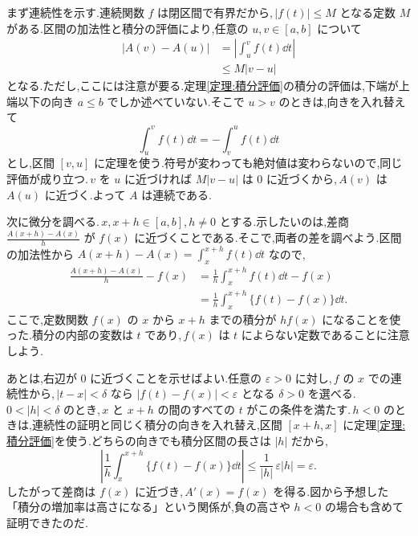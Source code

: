 まず連続性を示す.連続関数 $f$ は閉区間で有界だから,\,$|f(t)|\le M$ となる定数 $M$ がある.区間の加法性と積分の評価により,任意の $u,v\in[a,b]$ について
\begin{align*}
 |A(v)-A(u)|&=\left|\int_u^v f(t)\dd t\right|\\
 &\le M|v-u|
\end{align*}
となる.ただし,ここには注意が要る.定理\ref{定理:積分評価}の積分の評価は,下端が上端以下の向き $a\le b$ でしか述べていない.そこで $u>v$ のときは,向きを入れ替えて
\[
 \int_u^v f(t)\dd t=-\int_v^u f(t)\dd t
\]
とし,区間 $[v,u]$ に定理を使う.符号が変わっても絶対値は変わらないので,同じ評価が成り立つ.\,$v$ を $u$ に近づければ $M|v-u|$ は $0$ に近づくから,\,$A(v)$ は $A(u)$ に近づく.よって $A$ は連続である.

次に微分を調べる.\,$x,x+h\in[a,b]$,\,$h\ne0$ とする.示したいのは,差商 $\frac{A(x+h)-A(x)}h$ が $f(x)$ に近づくことである.そこで,両者の差を調べよう.区間の加法性から $A(x+h)-A(x)=\int_x^{x+h}f(t)\dd t$ なので,
\begin{align*}
 \frac{A(x+h)-A(x)}h-f(x)
 &=\frac1h\int_x^{x+h}f(t)\dd t-f(x)\\
 &=\frac1h\int_x^{x+h}\{f(t)-f(x)\}\dd t.
\end{align*}
ここで,定数関数 $f(x)$ の $x$ から $x+h$ までの積分が $hf(x)$ になることを使った.積分の内部の変数は $t$ であり,\,$f(x)$ は $t$ によらない定数であることに注意しよう.

あとは,右辺が $0$ に近づくことを示せばよい.任意の $\varepsilon>0$ に対し,\,$f$ の $x$ での連続性から,\,$|t-x|<\delta$ なら $|f(t)-f(x)|<\varepsilon$ となる $\delta>0$ を選べる.\,$0<|h|<\delta$ のとき,\,$x$ と $x+h$ の間のすべての $t$ がこの条件を満たす.\,$h<0$ のときは,連続性の証明と同じく積分の向きを入れ替え,区間 $[x+h,x]$ に定理\ref{定理:積分評価}を使う.どちらの向きでも積分区間の長さは $|h|$ だから,
\[
 \left|\frac1h\int_x^{x+h}\{f(t)-f(x)\}\dd t\right|
 \le\frac1{|h|}\,\varepsilon|h|=\varepsilon.
\]
したがって差商は $f(x)$ に近づき,\,$A'(x)=f(x)$ を得る.図から予想した「積分の増加率は高さになる」という関係が,負の高さや $h<0$ の場合も含めて証明できたのだ.

%
